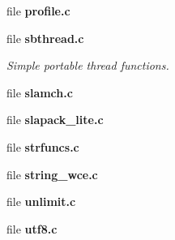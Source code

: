 \begin{DoxyCompactItemize}
file {\bfseries profile.\-c}
\item 
file {\bf sbthread.\-c}
\begin{DoxyCompactList}\small\item\em Simple portable thread functions. \end{DoxyCompactList}\item 
file {\bfseries slamch.\-c}
\item 
file {\bfseries slapack\-\_\-lite.\-c}
\item 
file {\bfseries strfuncs.\-c}
\item 
file {\bfseries string\-\_\-wce.\-c}
\item 
file {\bfseries unlimit.\-c}
\item 
file {\bfseries utf8.\-c}
\end{DoxyCompactItemize}
